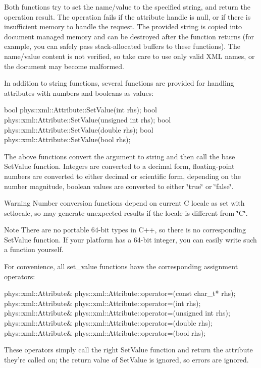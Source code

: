  Both functions try to set the name/value to the specified string, and return the operation result. The operation fails if the attribute handle is null, or if there is insufficient memory to handle the request. The provided string is copied into document managed memory and can be destroyed after the function returns (for example, you can safely pass stack-\/allocated buffers to these functions). The name/value content is not verified, so take care to use only valid XML names, or the document may become malformed. \par
 \par
 In addition to string functions, several functions are provided for handling attributes with numbers and booleans as values: 
\begin{DoxyCode}
 bool phys::xml::Attribute::SetValue(int rhs);
 bool phys::xml::Attribute::SetValue(unsigned int rhs);
 bool phys::xml::Attribute::SetValue(double rhs);
 bool phys::xml::Attribute::SetValue(bool rhs);
\end{DoxyCode}
 The above functions convert the argument to string and then call the base SetValue function. Integers are converted to a decimal form, floating-\/point numbers are converted to either decimal or scientific form, depending on the number magnitude, boolean values are converted to either \char`\"{}true\char`\"{} or \char`\"{}false\char`\"{}. \begin{DoxyWarning}{Warning}
Number conversion functions depend on current C locale as set with setlocale, so may generate unexpected results if the locale is different from \char`\"{}C\char`\"{}.
\end{DoxyWarning}
\begin{DoxyNote}{Note}
There are no portable 64-\/bit types in C++, so there is no corresponding SetValue function. If your platform has a 64-\/bit integer, you can easily write such a function yourself.
\end{DoxyNote}
For convenience, all set\_\-value functions have the corresponding assignment operators: 
\begin{DoxyCode}
 phys::xml::Attribute& phys::xml::Attribute::operator=(const char_t* rhs);
 phys::xml::Attribute& phys::xml::Attribute::operator=(int rhs);
 phys::xml::Attribute& phys::xml::Attribute::operator=(unsigned int rhs);
 phys::xml::Attribute& phys::xml::Attribute::operator=(double rhs);
 phys::xml::Attribute& phys::xml::Attribute::operator=(bool rhs);
\end{DoxyCode}
 These operators simply call the right SetValue function and return the attribute they're called on; the return value of SetValue is ignored, so errors are ignored. \par
